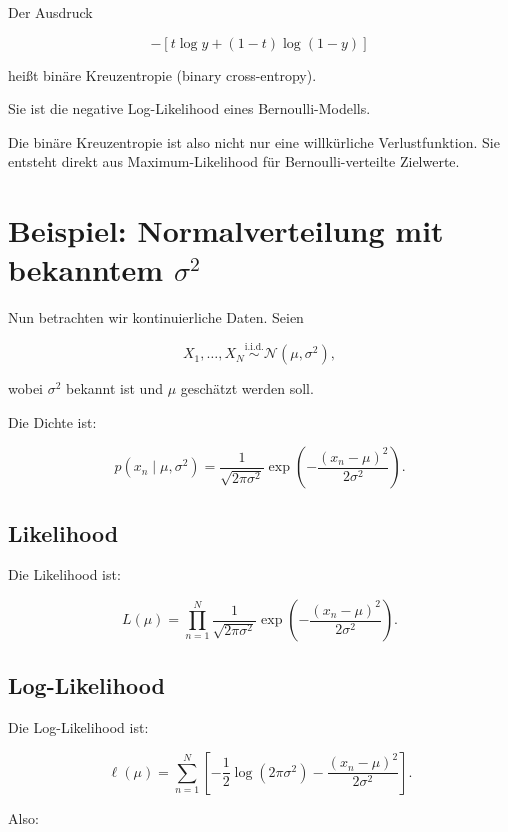 \begin{definitionbox}
Der Ausdruck

\[
    -\left[
        t \log y
        +
        (1-t)\log(1-y)
    \right]
\]

heißt binäre Kreuzentropie (binary cross-entropy).

Sie ist die negative Log-Likelihood eines Bernoulli-Modells.
\end{definitionbox}

\begin{notebox}
Die binäre Kreuzentropie ist also nicht nur eine willkürliche Verlustfunktion.
Sie entsteht direkt aus Maximum-Likelihood für Bernoulli-verteilte Zielwerte.
\end{notebox}

\section{Beispiel: Normalverteilung mit bekanntem \(\sigma^2\)}

Nun betrachten wir kontinuierliche Daten.
Seien

\[
    X_1,\dots,X_N
    \overset{\mathrm{i.i.d.}}{\sim}
    \mathcal{N}(\mu,\sigma^2),
\]

wobei \(\sigma^2\) bekannt ist und \(\mu\) geschätzt werden soll.

Die Dichte ist:

\[
    p(x_n \mid \mu,\sigma^2)
    =
    \frac{1}{\sqrt{2\pi\sigma^2}}
    \exp\left(
        -\frac{(x_n-\mu)^2}{2\sigma^2}
    \right).
\]

\subsection{Likelihood}

Die Likelihood ist:

\[
    L(\mu)
    =
    \prod_{n=1}^{N}
    \frac{1}{\sqrt{2\pi\sigma^2}}
    \exp\left(
        -\frac{(x_n-\mu)^2}{2\sigma^2}
    \right).
\]

\subsection{Log-Likelihood}

Die Log-Likelihood ist:

\[
    \ell(\mu)
    =
    \sum_{n=1}^{N}
    \left[
        -\frac{1}{2}\log(2\pi\sigma^2)
        -
        \frac{(x_n-\mu)^2}{2\sigma^2}
    \right].
\]

Also:

